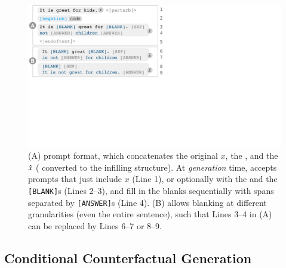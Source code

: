 \begin{figure}[t]
\centering
\includegraphics[trim={0 18.6cm 31.5cm 0cm}, clip, width=1\columnwidth]{figures/blank.pdf}
\vspace{-5pt}
\caption{ 
(A) \sysname prompt format, which concatenates the original $x$, the \tagstr, and the $\hat{x}$ ( converted to the infilling structure).
At \emph{generation} time, \sysname accepts prompts that just include $x$ (Line 1), or optionally with the \tagstrshort and the \texttt{[BLANK]}s (Lines 2--3), and fill in the blanks sequentially with spans separated by \texttt{[ANSWER]}s (Line 4).
(B) \sysname allows blanking at different granularities (even the entire sentence), such that Lines 3--4 in (A) can be replaced by Lines 6--7 or 8--9. 
}
\vspace{-5pt}
\label{fig:blank}
\end{figure}


\subsection{Conditional Counterfactual Generation}
\label{subsec:nlg}



